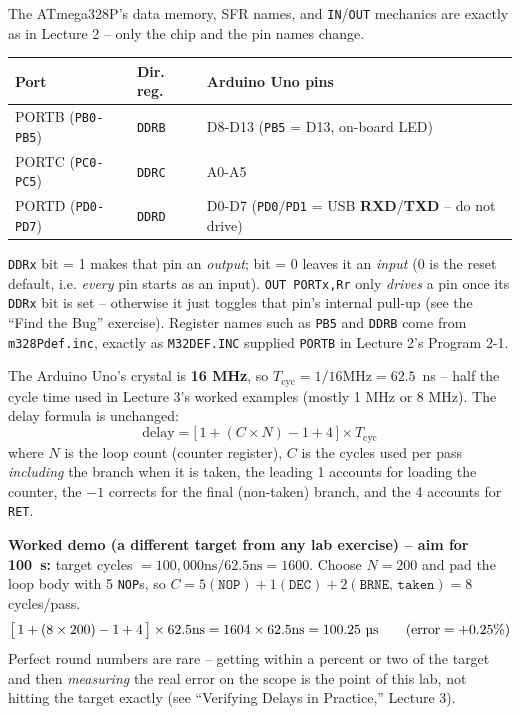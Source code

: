 \documentclass[11pt]{article}
\begin{document}
\begin{summary}
The ATmega328P's data memory, SFR names, and \texttt{IN}/\texttt{OUT} mechanics are
exactly as in Lecture 2 -- only the chip and the pin names change.
\begin{center}
\begin{tabular}{@{}p{3.7cm}p{1.7cm}p{8.9cm}@{}}
\toprule
\textbf{Port} & \textbf{Dir. reg.} & \textbf{Arduino Uno pins} \\
\midrule
PORTB (\texttt{PB0-PB5}) & \texttt{DDRB} & D8-D13 (\texttt{PB5} = D13, on-board LED) \\
PORTC (\texttt{PC0-PC5}) & \texttt{DDRC} & A0-A5 \\
PORTD (\texttt{PD0-PD7}) & \texttt{DDRD} & D0-D7 (\texttt{PD0}/\texttt{PD1} = USB
\textbf{RXD}/\textbf{TXD} -- do not drive) \\
\bottomrule
\end{tabular}
\end{center}
\texttt{DDRx} bit = 1 makes that pin an \emph{output}; bit = 0 leaves it an
\emph{input} (0 is the reset default, i.e. \emph{every} pin starts as an input).
\texttt{OUT PORTx,Rr} only \emph{drives} a pin once its \texttt{DDRx} bit is set --
otherwise it just toggles that pin's internal pull-up (see the ``Find the Bug''
exercise). Register names such as \texttt{PB5} and \texttt{DDRB} come from
\texttt{m328Pdef.inc}, exactly as \texttt{M32DEF.INC} supplied \texttt{PORTB} in
Lecture 2's Program 2-1.
\end{summary}

\begin{summary}
The Arduino Uno's crystal is \textbf{16 MHz}, so
$T_{\text{cyc}} = 1/16\text{MHz} = 62.5$~ns -- half the cycle time used in Lecture 3's
worked examples (mostly 1 MHz or 8 MHz). The delay formula is unchanged:
\[
\text{delay} = \big[\,1 + (C \times N) - 1 + 4\,\big] \times T_{\text{cyc}}
\]
where $N$ is the loop count (counter register), $C$ is the cycles used per pass
\emph{including} the branch when it is taken, the leading 1 accounts for loading the
counter, the $-1$ corrects for the final (non-taken) branch, and the 4 accounts for
\texttt{RET}.

\textbf{Worked demo (a different target from any lab exercise) -- aim for
100~\textmu s:} target cycles $= 100{,}000\text{ns} / 62.5\text{ns} = 1600$. Choose
$N=200$ and pad the loop body with 5 \texttt{NOP}s, so
$C = 5(\texttt{NOP}) + 1(\texttt{DEC}) + 2(\texttt{BRNE, taken}) = 8$ cycles/pass.
\[
\big[\,1 + (8\times200) - 1 + 4\,\big]\times62.5\text{ns} = 1604 \times 62.5\text{ns}
= 100.25\ \text{\textmu s} \qquad (\text{error} = +0.25\%)
\]
Perfect round numbers are rare -- getting within a percent or two of the target and
then \emph{measuring} the real error on the scope is the point of this lab, not
hitting the target exactly (see ``Verifying Delays in Practice,'' Lecture 3).
\end{summary}
\end{document}
